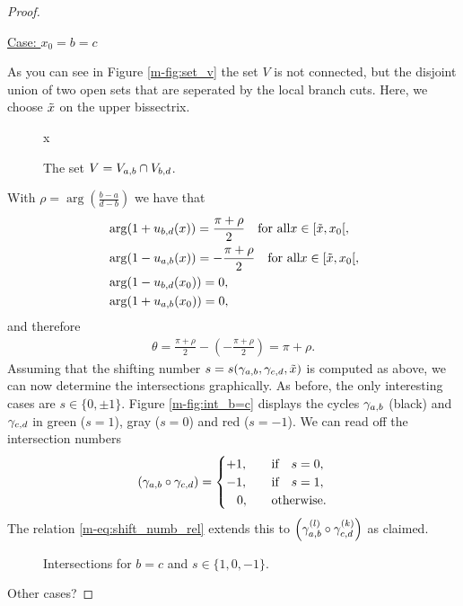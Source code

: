 \documentclass[main.tex]{subfiles}
\begin{document}
\begin{proof}
\begin{itemize}
  \begin{center}
   \underline{Case: $x_0 = b = c$}
  \end{center}
  As you can see in Figure \ref{m-fig:set_v} the set $V$ is not connected, but the disjoint union of two open sets that are seperated by the local branch cuts. Here, we choose $\tilde{x}$ on the upper bissectrix.
   \begin{figure}[H]
      \begin{center}
   
      \end{center}x
    \caption{The set $V = V_{a,b} \cap V_{b,d}$.}
    \label{fig:set_v}
\end{figure}
  With $\rho = \arg\left(\frac{b-a}{d-b}\right)$ we have that
  \begin{align*}
   & \arg (1+u_{b,d}(x)) = \frac{\pi+\rho}{2} \quad \text{for all}  x \in [\tilde{x},x_0[,\\
   & \arg (1-u_{a,b}(x)) = -\frac{\pi+\rho}{2} \quad \text{for all}  x \in [\tilde{x},x_0[,\\
   & \arg (1-u_{b,d}(x_0)) = 0,\\
   & \arg (1+u_{a,b}(x_0))= 0,
  \end{align*}
  and therefore
  \begin{align*}
   \theta = \frac{\pi+\rho}{2} - \left(-\frac{\pi+\rho}{2}\right) = \pi + \rho.
  \end{align*}
  Assuming that the shifting number $s=s(\gamma_{a,b},\gamma_{c,d},\tilde{x})$ is computed as above, we can now determine the intersections graphically. \abstandl
  As before, the only interesting cases
  are $s \in \{0,\pm 1\}$. Figure \ref{m-fig:int_b=c} displays the cycles $\gamma_{a,b}$ (black) and $\gamma_{c,d}$ in green ($s=1$), gray ($s=0$) and red ($s=-1$).
  We can read off the intersection numbers
  \begin{align*}
    \left(\gamma_{a,b} \circ \gamma_{c,d}\right) = \begin{cases}
                                          +1, \quad & \text{if} \quad s=0,\\
                                          -1, \quad & \text{if} \quad s=1,\\
                                          \quad\!0, \quad & \text{otherwise}.
                                         \end{cases}
  \end{align*}
  The relation \eqref{m-eq:shift_numb_rel} extends this to $\left(\gamma_{a,b}^{(l)} \circ \gamma_{c,d}^{(k)}\right)$ as claimed.
  \begin{figure}[H]
      \begin{center}
   
      \end{center}
    \caption{Intersections for $b=c$ and $s \in \{1,0,-1\}$.}
    \label{fig:int_b=c}
\end{figure}
 \end{itemize}
 \todo Other cases?
  \end{proof}
\end{document}
